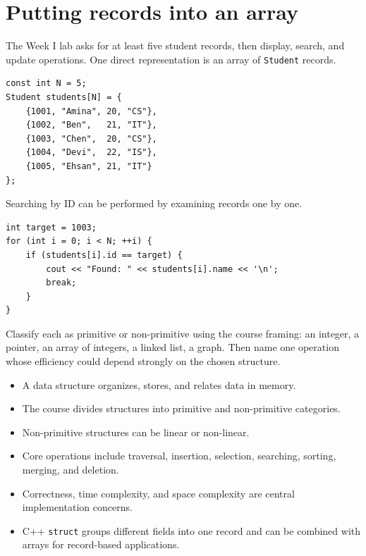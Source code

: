 \section{Putting records into an array}

The Week I lab asks for at least five student records, then display, search, and update operations. One direct representation is an array of \texttt{Student} records.

\begin{lstlisting}
const int N = 5;
Student students[N] = {
    {1001, "Amina", 20, "CS"},
    {1002, "Ben",   21, "IT"},
    {1003, "Chen",  20, "CS"},
    {1004, "Devi",  22, "IS"},
    {1005, "Ehsan", 21, "IT"}
};
\end{lstlisting}

Searching by ID can be performed by examining records one by one.

\begin{lstlisting}
int target = 1003;
for (int i = 0; i < N; ++i) {
    if (students[i].id == target) {
        cout << "Found: " << students[i].name << '\n';
        break;
    }
}
\end{lstlisting}

\begin{quickcheck}
Classify each as primitive or non-primitive using the course framing: an integer, a pointer, an array of integers, a linked list, a graph. Then name one operation whose efficiency could depend strongly on the chosen structure.
\end{quickcheck}

\begin{chapterrecap}
\begin{itemize}
  \item A data structure organizes, stores, and relates data in memory.
  \item The course divides structures into primitive and non-primitive categories.
  \item Non-primitive structures can be linear or non-linear.
  \item Core operations include traversal, insertion, selection, searching, sorting, merging, and deletion.
  \item Correctness, time complexity, and space complexity are central implementation concerns.
  \item C++ \texttt{struct} groups different fields into one record and can be combined with arrays for record-based applications.
\end{itemize}
\end{chapterrecap}


